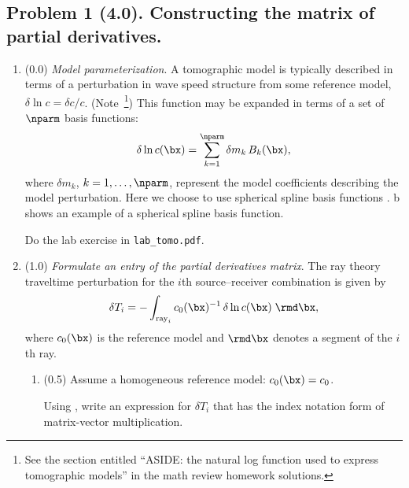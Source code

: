\documentclass[11pt,titlepage,fleqn]{article}
\begin{document}

\subsection*{Problem 1 (4.0). Constructing the matrix of partial derivatives.}

\begin{enumerate}
\item (0.0) {\em Model parameterization}. A tomographic model is typically described in terms of a perturbation in wave speed structure from some reference model, \ie $\delta\ln c = \delta c/c$.
(Note~\footnote{See the section entitled ``ASIDE: the natural log function used to express tomographic models'' in the math review homework solutions.})
This function may be expanded in terms of a set of $\nparm$ basis functions:
%
\begin{equation}
\delta\ln c(\bx)=\sum_{k=1}^\nparm \delta m_k\,B_k(\bx),
\label{dlnv}
\end{equation}
%
where $\delta m_k$, $k=1,\ldots,\nparm$, represent the model coefficients describing the model perturbation.  Here we choose to use spherical spline basis functions \citep{WangDahlen1995spline,Wang1998}.
b shows an example of a spherical spline basis function.

Do the lab exercise in \verb+lab_tomo.pdf+.


\item (1.0) {\em Formulate an entry of the partial derivatives matrix}.
%
The ray theory traveltime perturbation for the $i$th source--receiver combination is given by
%
\begin{equation}
\delta T_i = -\int_{\mathrm{ray}_i} c_0(\bx)^{-1}\,\delta\ln c(\bx)\;\rmd\bx,
\label{ray_tomography}
\end{equation}
%
where $c_0(\bx)$ is the reference model and $\rmd \bx$ denotes a segment of the $i$th ray.

\begin{enumerate}
\item (0.5) Assume a homogeneous reference model: $c_0(\bx) = c_0$.

Using , write an expression for $\delta T_i$ that has the index notation form of matrix-vector multiplication.


\end{enumerate}
\end{enumerate}
\end{document}
